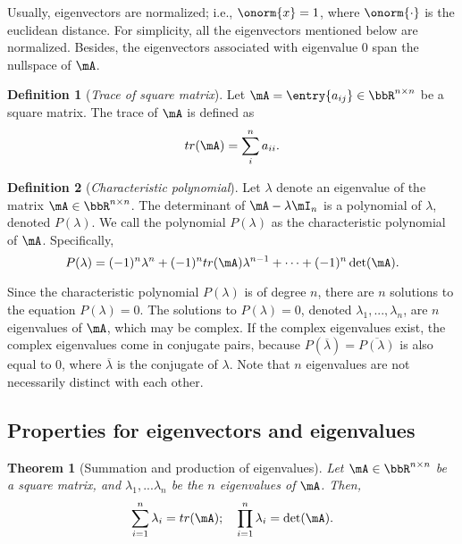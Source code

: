\documentclass[11pt]{article}
\theoremstyle{plain}
\newtheorem{thm}{Theorem}[section]
\theoremstyle{definition}
\newtheorem{defn}{Definition}
\begin{document}
 Usually, eigenvectors are normalized; i.e., $\onorm{x} = 1$, where $\onorm{\cdot}$ is the euclidean distance. For simplicity, all the eigenvectors mentioned below are normalized. Besides, the eigenvectors associated with eigenvalue 0 span the nullspace of $\mA$.

\begin{defn}[\textit{Trace of square matrix}]\label{def:trace}
Let $\mA = \entry{a_{ij}} \in \bbR^{n \times n}$ be a square matrix. The trace of $\mA$ is defined as
\[ tr(\mA) = \sum_{i}^n a_{ii}.\] 
\end{defn}

\begin{defn}[\textit{Characteristic polynomial}]\label{def:charac}
	Let $\lambda$ denote an eigenvalue of the matrix $\mA\in \bbR^{n \times n}$.
	The determinant of $\mA - \lambda \mI_n$ is a polynomial of $\lambda$, denoted $P(\lambda)$. We call the polynomial $P(\lambda)$ as the characteristic polynomial of $\mA$. Specifically,
	\begin{equation}\label{def:charapoly}
		 P(\lambda)  = (-1)^n \lambda^n +  (-1)^n  tr(\mA)\lambda^{n-1} + \cdots + (-1)^n \det(\mA). 
	\end{equation}
\end{defn}

Since the characteristic polynomial $P(\lambda)$ is of degree $n$, there are $n$ solutions to the equation $P(\lambda) = 0$. The solutions to $P(\lambda) = 0$, denoted $\lambda_1,...,\lambda_n$, are $n$ eigenvalues of $\mA$, which may be complex. If the complex eigenvalues exist, the complex eigenvalues come in conjugate pairs, because $P(\overline{ \lambda}) = \overline{ P(\lambda)} $ is also equal to 0, where $\overline{ \lambda}$ is the conjugate of $\lambda$. Note that $n$ eigenvalues are not necessarily distinct with each other. 

\subsection{Properties for eigenvectors and eigenvalues}

\begin{thm}[Summation and production of eigenvalues]\label{thm:speigen}
	Let  $\mA \in \bbR^{n \times n}$ be a square matrix, and $\lambda_1,...\lambda_n$ be the $n$ eigenvalues of $\mA$. Then,
	\begin{equation}
		\sum_{i=1}^n \lambda_i = tr(\mA); \quad \prod_{i=1}^n \lambda_i = \det(\mA).
	\end{equation} 
\end{thm}
\end{document}

